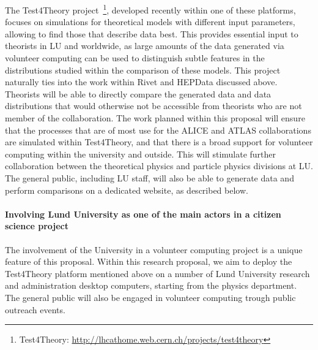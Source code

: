 \documentclass[a4paper,justified]{tufte-handout}
\begin{document}
The Test4Theory project~\footnote{Test4Theory:
  \url{http://lhcathome.web.cern.ch/projects/test4theory}}, developed recently
within one of these platforms, focuses on simulations for theoretical models
with different input parameters, allowing to find those that describe data
best. This provides essential input to theorists in LU and
worldwide, as large amounts of the data generated via volunteer computing can be used to distinguish subtle features in the distributions studied within the comparison of these models. 
This project naturally ties into the work within Rivet and HEPData discussed above. Theorists will be able to directly compare the generated data and data distributions that would otherwise not be accessible from theorists who are not member of the collaboration. The work planned within this proposal
will ensure that the processes that are of most use for the ALICE and ATLAS
collaborations are simulated within Test4Theory, and that there is a broad
support for volunteer computing within the university and outside. This will
stimulate further collaboration between the theoretical physics and particle physics divisions at LU. The general public, including LU staff, will also be able to generate data and perform  comparisons on a dedicated website, as described below. 


\vspace{-10px}
\paragraph{Involving Lund University as one of the main actors in a citizen science project} %

The involvement of the University in a volunteer computing project is a unique feature of this proposal. Within this research proposal, we aim to deploy the Test4Theory platform mentioned above on a number of Lund University research and administration desktop computers, starting from the physics department. The general public will also be engaged in volunteer computing trough public outreach events. 
\end{document}
